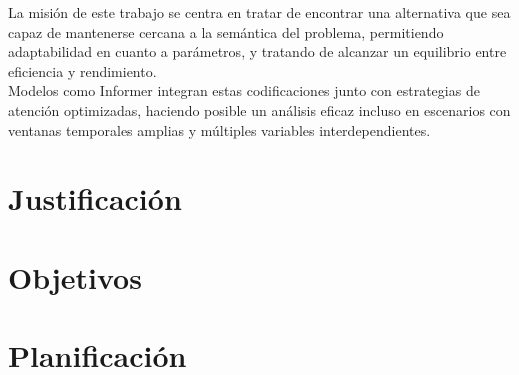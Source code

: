La misión de este trabajo se centra en tratar de encontrar una alternativa que sea capaz de mantenerse cercana a la semántica del problema, permitiendo adaptabilidad en cuanto a parámetros, y tratando de alcanzar un equilibrio entre eficiencia y rendimiento.\\

Modelos como Informer integran estas codificaciones junto con estrategias de atención optimizadas, haciendo posible un análisis eficaz incluso en escenarios con ventanas temporales amplias y múltiples variables interdependientes.

\section{Justificación}


\section{Objetivos}

\section{Planificación}